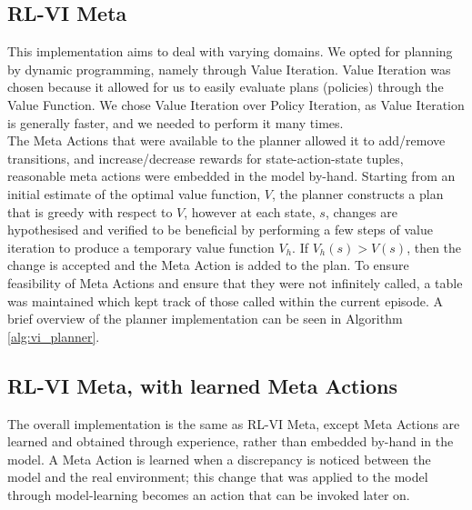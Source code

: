 \subsection{RL-VI Meta}
This implementation aims to deal with varying domains. We opted for planning by dynamic programming, namely through Value Iteration. Value Iteration was chosen because it allowed for us to easily evaluate plans (policies) through the Value Function. We chose Value Iteration over Policy Iteration, as Value Iteration is generally faster, and we needed to perform it many times.
\\The Meta Actions that were available to the planner allowed it to add/remove transitions, and increase/decrease rewards for state-action-state tuples, reasonable meta actions were embedded in the model by-hand. Starting from an initial estimate of the optimal value function, $V$, the planner constructs a plan that is greedy with respect to $V$, however at each state, $s$, changes are hypothesised and verified to be beneficial by performing a few steps of value iteration to produce a temporary value function $V_h$. If $V_h(s) > V(s)$, then the change is accepted and the Meta Action is added to the plan.
To ensure feasibility of Meta Actions and ensure that they were not infinitely called, a table was maintained which kept track of those called within the current episode. A brief overview of the planner implementation can be seen in Algorithm \ref{alg:vi_planner}.
\subsection{RL-VI Meta, with learned Meta Actions}
The overall implementation is the same as RL-VI Meta, except Meta Actions are learned and obtained through experience, rather than embedded by-hand in the model. A Meta Action is learned when a discrepancy is noticed between the model and the real environment; this change that was applied to the model through model-learning becomes an action that can be invoked later on.


